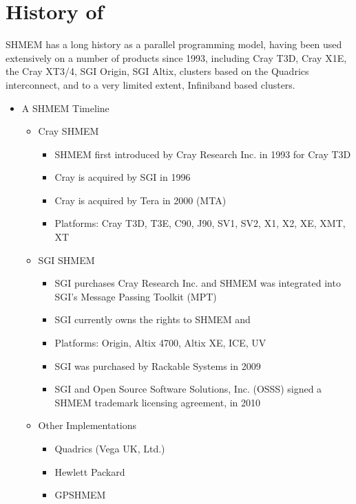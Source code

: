 \clearpage







\chapter{History of \openshmem}\label{sec:openshmem_history}

SHMEM has a long history as a parallel programming model, having been used
extensively on a number of products since 1993, including Cray T3D, Cray X1E,
the Cray XT3/4, SGI Origin, SGI Altix, clusters based on the Quadrics
interconnect, and to a very limited extent, Infiniband based clusters.

\begin{itemize}
\item A SHMEM Timeline
  \begin{itemize}
  \item Cray SHMEM
    \begin{itemize}
    \item SHMEM first introduced by Cray Research Inc. in 1993 for Cray T3D
    \item Cray is acquired by SGI in 1996
    \item Cray is acquired by Tera in 2000 (MTA)
    \item Platforms: Cray T3D, T3E, C90, J90, SV1, SV2, X1, X2, XE, XMT, XT
    \end{itemize}
  \item SGI SHMEM
    \begin{itemize}
    \item SGI purchases  Cray Research Inc. and SHMEM was integrated into
      SGI's Message Passing Toolkit (MPT)
    \item SGI currently owns the rights to SHMEM and \openshmem
    \item Platforms: Origin, Altix 4700, Altix XE, ICE, UV
    \item SGI was purchased by Rackable Systems in 2009
    \item SGI and Open Source Software Solutions, Inc. (OSSS) signed a
      SHMEM trademark licensing agreement, in 2010
    \end{itemize}
  \item Other Implementations
    \begin{itemize}
    \item Quadrics (Vega UK, Ltd.)
    \item Hewlett Packard
    \item GPSHMEM

\end{itemize}
\end{itemize}
\end{itemize}
